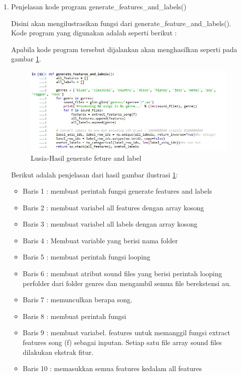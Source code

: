 \begin{enumerate}
\item Penjelasan kode program generate\_features\_and\_labels()
	\par Disini akan mengilustrasikan fungsi dari generate\_feature\_and\_labels(). Kode program yang digunakan adalah  seperti berikut :
	
	\par Apabila kode program tersebut dijalankan akan menghasilkan seperti pada gambar \ref{6B5}.
		\begin{figure}[!hbtp]
		\centering
		\includegraphics[scale=0.4]{figures/t4.jpg}
		\caption{Lusia-Hasil generate feture and label}
		\label{6B5}
		\end{figure}
	\par Berikut adalah penjelasan dari hasil gambar ilustrasi \ref{6B5}:
	\begin{itemize}
	\item Baris 1 : membuat perintah fungsi generate features and labels
	\item Baris 2 : membuat variabel all features dengan array kosong
	\item Baris 3 : membuat variabel all labels dengan array kosong
	\item Baris 4 : Membuat variable yang berisi nama folder
	\item Baris 5 : membuat perintah fungsi looping
	\item Baris 6 : membuat atribut sound files yang berisi perintah looping perfolder dari folder genres dan mengambil semua file berekstensi au.
	\item Baris 7 : memunculkan berapa song.
	\item Baris 8 : membuat perintah fungsi
	\item Baris 9 : membuat variabel. features untuk memanggil fungsi extract features song (f) sebagai inputan. Setiap satu file array sound files dilakukan ekstrak fitur.
	\item Baris 10 : memasukkan semua features kedalam all features

\end{itemize}
\end{enumerate}
